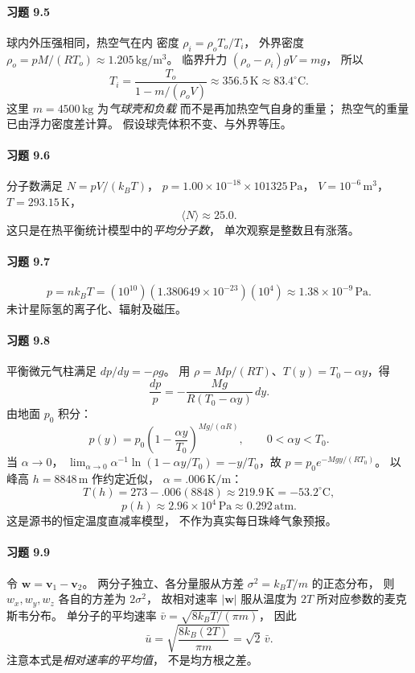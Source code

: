 \paragraph{习题 9.5}
球内外压强相同，热空气在内
密度 \(\rho_i=\rho_oT_o/T_i\)，
外界密度
\(\rho_o=pM/(RT_o)\approx1.205\,\mathrm{kg/m^3}\)。
临界升力
\((\rho_o-\rho_i)gV=mg\)，
所以
\[
 \boxed{T_i=\frac{T_o}{1-m/(\rho_o V)}
 \approx356.5\,\mathrm K\approx83.4^\circ\mathrm C}.
\]
这里 \(m=4500\,\mathrm{kg}\) 为\emph{气球壳和负载}
而不是再加热空气自身的重量；
热空气的重量已由浮力密度差计算。
假设球壳体积不变、与外界等压。

\paragraph{习题 9.6}
分子数满足
\(N=pV/(k_BT)\)，
\(p=1.00\times10^{-18}\times101325\,\mathrm{Pa}\)，
\(V=10^{-6}\,\mathrm{m^3}\)，
\(T=293.15\,\mathrm K\)，
\[
 \boxed{\langle N\rangle\approx25.0}.
\]
这只是在热平衡统计模型中的\emph{平均分子数}，
单次观察是整数且有涨落。

\paragraph{习题 9.7}
\[
 \boxed{p=nk_BT
 =(10^{10})(1.380649\times10^{-23})(10^4)
 \approx1.38\times10^{-9}\,\mathrm{Pa}}.
\]
未计星际氢的离子化、辐射及磁压。

\paragraph{习题 9.8}
平衡微元气柱满足 \(dp/dy=-\rho g\)。
用 \(\rho=Mp/(RT)\)、\(T(y)=T_0-\alpha y\)，得
\[
 \frac{dp}{p}=-\frac{Mg}{R(T_0-\alpha y)}\,dy.
\]
由地面 \(p_0\) 积分：
\[
 \boxed{p(y)=p_0
 \left(1-\frac{\alpha y}{T_0}\right)^{Mg/(\alpha R)}},
 \qquad 0<\alpha y<T_0.
\]
当 \(\alpha\to0\)，
\(\lim_{\alpha\to0}\alpha^{-1}\ln(1-\alpha y/T_0)
 =-y/T_0\)，故
\(\boxed{p=p_0e^{-Mgy/(RT_0)}}\)。
以峰高 \(h=8848\,\mathrm m\) 作约定近似，
\(\alpha=.006\,\mathrm{K/m}\)：
\[
 \boxed{T(h)=273-.006(8848)
 \approx219.9\,\mathrm K=-53.2^\circ\mathrm C},
\]
\[
 \boxed{p(h)\approx2.96\times10^4\,\mathrm{Pa}
 \approx0.292\,\mathrm{atm}}.
\]
这是源书的恒定温度直减率模型，
不作为真实每日珠峰气象预报。

\paragraph{习题 9.9}
令 \(\boldsymbol w=\boldsymbol v_1-\boldsymbol v_2\)。
两分子独立、各分量服从方差
\(\sigma^2=k_BT/m\) 的正态分布，
则 \(w_x,w_y,w_z\) 各自的方差为
\(2\sigma^2\)，
故相对速率 \(|\boldsymbol w|\)
服从温度为 \(2T\) 所对应参数的麦克斯韦分布。
单分子的平均速率
\(\bar v=\sqrt{8k_BT/(\pi m)}\)，
因此
\[
 \boxed{\bar u=\sqrt{\frac{8k_B(2T)}{\pi m}}
 =\sqrt2\,\bar v}.
\]
注意本式是\emph{相对速率的平均值}，
不是均方根之差。

